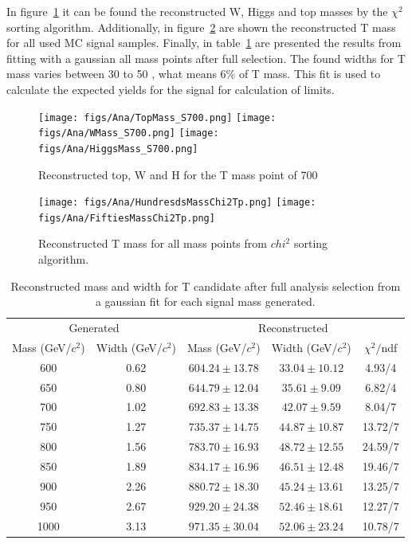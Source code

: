 In figure~\ref{fig:WHt} it can be found the reconstructed W, Higgs and top masses by the $\chi^{2}$ sorting algorithm. Additionally, in figure~\ref{fig:RecT} are shown the reconstructed T mass for all used MC signal samples. Finally, in table~\ref{tab:SignalWidths} are presented the results from fitting with a gaussian all mass points after full selection. The found widths for T mass varies between 30 to 50 \GeVcc, what means 6\% of T mass. This fit is used to calculate the expected yields for the signal for calculation of limits.

\begin{figure}[!Hhtbp]
  \begin{center}
    \texttt{[image: figs/Ana/TopMass\_S700.png]}
    \texttt{[image: figs/Ana/WMass\_S700.png]}
    \texttt{[image: figs/Ana/HiggsMass\_S700.png]}
    \caption{Reconstructed top, W and H for the T mass point of 700 \GeVcc}
    \label{fig:WHt}
  \end{center}
\end{figure}

\begin{figure}[!Hhtbp]
  \begin{center}
    \texttt{[image: figs/Ana/HundresdsMassChi2Tp.png]}
    \texttt{[image: figs/Ana/FiftiesMassChi2Tp.png]}
    \caption{Reconstructed T mass for all mass points from $chi^{2}$ sorting algorithm.}
    \label{fig:RecT}
  \end{center}
\end{figure}

\begin{table}[htbH]
\begin{center}
\begin{tabular}{|c|c|c|c|c|}
\hline 
\multicolumn{2}{|c}{Generated} & \multicolumn{3}{|c|}{Reconstructed} \\
Mass (GeV/$c^{2}$) & Width (GeV/$c^{2}$) & Mass (GeV/$c^{2}$) & Width (GeV/$c^{2}$) & $\chi^{2} /$ndf\\
\hline
600 & 0.62 &$604.24\pm13.78$ & $33.04\pm10.12$ & 4.93/4\\
650 & 0.80 &$644.79\pm12.04$ & $35.61\pm9.09$ & 6.82/4\\
700 & 1.02 &$692.83\pm13.38$ & $42.07\pm9.59$ & 8.04/7\\
750 & 1.27 &$735.37\pm14.75$ & $44.87\pm10.87$ & 13.72/7\\
800 & 1.56 &$783.70\pm16.93$ & $48.72\pm12.55$ & 24.59/7\\
850 & 1.89 &$834.17\pm16.96$ & $46.51\pm12.48$ & 19.46/7\\
900 & 2.26 &$880.72\pm18.30$ & $45.24\pm13.61$ & 13.25/7\\
950 & 2.67 &$929.20\pm24.38$ & $52.46\pm18.61$ & 12.27/7\\
1000 & 3.13 &$971.35\pm30.04$ & $52.06\pm23.24$ & 10.78/7\\
\hline
\end{tabular}
\caption{Reconstructed mass and width for T candidate after full analysis selection from a gaussian fit for each signal mass generated. \label{tab:SignalWidths}}
\end{center}
\end{table}

